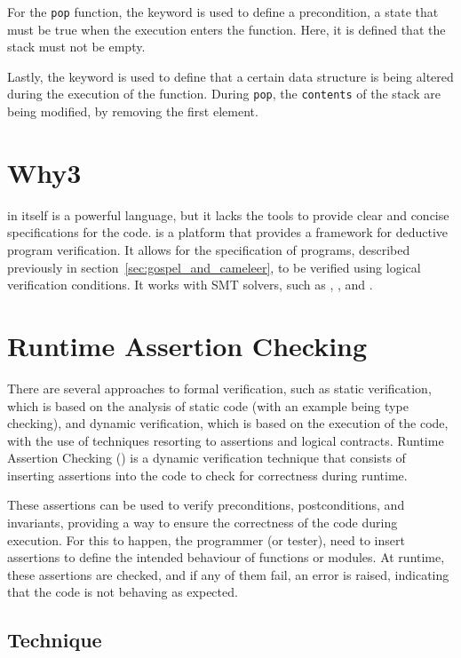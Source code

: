 For the \texttt{pop} function, the  keyword is used to define a precondition, 
a state that must be true when the execution enters the function. Here, it is defined that 
the stack must not be empty.

Lastly, the  keyword is used to define that a certain data structure is being 
altered during the execution of the function. During \texttt{pop}, the \texttt{contents} of 
the stack are being modified, by removing the first element.

\section{Why3}
\label{sec:why3}

\ocaml in itself is a powerful language, but it lacks the tools to provide clear 
and concise specifications for the code. \why is a platform that provides a framework 
for deductive program verification. It allows for the specification of programs, 
described previously in section~\ref{sec:gospel_and_cameleer}, to be verified using 
logical verification conditions. It works with SMT solvers, such as \zthree, \altergo, 
and \coq.

\section{Runtime Assertion Checking}
\label{sec:rac}

There are several approaches to formal verification, such as static verification, 
which is based on the analysis of static code (with an example being type checking), and dynamic 
verification, which is based on the execution of the code, with the use of 
techniques resorting to assertions and logical contracts. Runtime Assertion Checking 
(\rac) is a dynamic verification technique that consists of inserting assertions 
into the code to check for correctness during runtime.

These assertions can be used to verify preconditions, postconditions, and invariants, 
providing a way to ensure the correctness of the code during execution. For this to 
happen, the programmer (or tester), need to insert assertions to define the intended 
behaviour of functions or modules. At runtime, these assertions are checked, and if 
any of them fail, an error is raised, indicating that the code is not behaving as 
expected.

\subsection{Technique}
\label{sub:technique}

